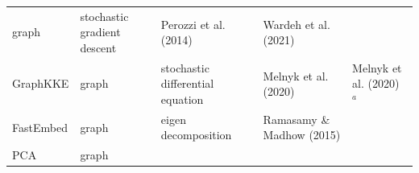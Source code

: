 \documentclass[11pt]{article}
\begin{document}
\begin{longtable}[]{@{}lllll@{}}
\begin{minipage}[t]{0.11\columnwidth}
graph\strut
\end{minipage} & \begin{minipage}[t]{0.23\columnwidth}\raggedright
stochastic gradient descent\strut
\end{minipage} & \begin{minipage}[t]{0.14\columnwidth}\raggedright
Perozzi et al. (2014)\strut
\end{minipage} & \begin{minipage}[t]{0.29\columnwidth}\raggedright
Wardeh et al. (2021)\strut
\end{minipage}\tabularnewline
\begin{minipage}[t]{0.09\columnwidth}\raggedright
GraphKKE\strut
\end{minipage} & \begin{minipage}[t]{0.11\columnwidth}\raggedright
graph\strut
\end{minipage} & \begin{minipage}[t]{0.23\columnwidth}\raggedright
stochastic differential equation\strut
\end{minipage} & \begin{minipage}[t]{0.14\columnwidth}\raggedright
Melnyk et al. (2020)\strut
\end{minipage} & \begin{minipage}[t]{0.29\columnwidth}\raggedright
Melnyk et al. (2020) \(^a\)\strut
\end{minipage}\tabularnewline
\begin{minipage}[t]{0.09\columnwidth}\raggedright
FastEmbed\strut
\end{minipage} & \begin{minipage}[t]{0.11\columnwidth}\raggedright
graph\strut
\end{minipage} & \begin{minipage}[t]{0.23\columnwidth}\raggedright
eigen decomposition\strut
\end{minipage} & \begin{minipage}[t]{0.14\columnwidth}\raggedright
Ramasamy \& Madhow (2015)\strut
\end{minipage} & \begin{minipage}[t]{0.29\columnwidth}\raggedright
\strut
\end{minipage}\tabularnewline
\begin{minipage}[t]{0.09\columnwidth}\raggedright
PCA\strut
\end{minipage} & \begin{minipage}[t]{0.11\columnwidth}\raggedright
graph\strut
\end{minipage} & \begin{minipage}[t]{0.23\columnwidth}\raggedright

\end{minipage}
\end{longtable}
\end{document}
